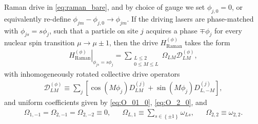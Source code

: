 \documentclass[nofootinbib,notitlepage,11pt]{revtex4-2}
\renewcommand{\t}{\text} %
\newcommand{\p}[1]{\left(#1\right)} %
\renewcommand{\sp}[1]{\left[#1\right]} %
\renewcommand{\set}[1]{\left\{#1\right\}} %
\newcommand{\1}{\mathds{1}}
\newcommand{\D}{\mathcal{D}}
\begin{document}
Raman drive in \eqref{eq:raman_bare}, and by choice of gauge we set
$\phi_{j,0}=0$, or equivalently re-define
$\phi_{jm}-\phi_{j,0}\to\phi_{jm}$.  If the driving lasers are
phase-matched with $\phi_{js}=s\phi_j$, such that a particle on site
$j$ acquires a phase $\mp\phi_j$ for every nuclear spin transition
$\mu\to\mu\pm1$, then the drive $H_{\t{Raman}}^{(\phi)}$ takes the
form
\begin{align}
  \left. H_{\t{Raman}}^{(\phi)} \right|_{\phi_{js}=s\phi_j}
  = \sum_{\substack{L\le2\\0\le M\le L}} \Omega_{LM} \D_{LM}^{(\phi)},
\end{align}
with inhomogeneously rotated collective drive operators
\begin{align}
  \D_{LM}^{(\phi)}
  \equiv \sum_j \sp{\cos\p{M\phi_j} D_{LM}^{(j)}
    + \sin\p{M\phi_j} D_{L,-M}^{(j)}},
\end{align}
and uniform coefficients given by \eqref{eq:O_01_0}, \eqref{eq:O_2_0},
and
\begin{align}
  \Omega_{1,-1} = \Omega_{2,-1} = \Omega_{2,-2} \equiv 0,
  &&
  \Omega_{L,1} \equiv \sum_{s\in\set{\pm1}} \omega_{Ls},
  &&
  \Omega_{2,2} \equiv \omega_{2,2}.
\end{align}




\end{document}
